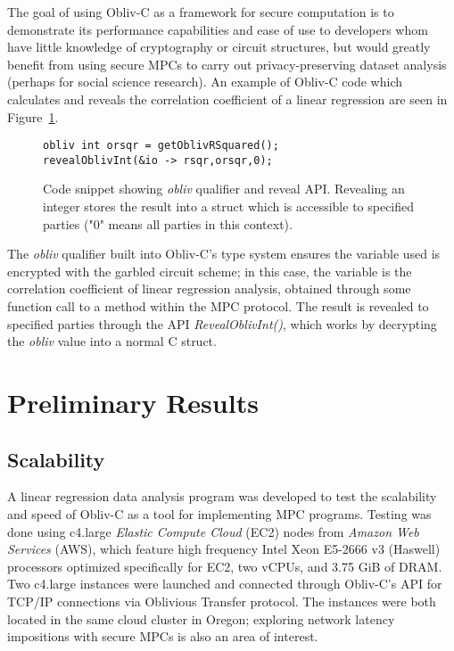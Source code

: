 \documentclass[conference]{IEEEtran}
\begin{document}
The goal of using Obliv-C as a framework for secure computation is to demonstrate 
its performance capabilities and ease of use to developers whom have little 
knowledge of cryptography or circuit structures, but would greatly benefit from 
using secure MPCs to carry out privacy-preserving dataset analysis (perhaps for
social science research). An example of Obliv-C code which calculates and 
reveals the correlation coefficient of a linear regression are seen in Figure~\ref{fig1}.
\begin{figure}[!b]
\centering
\begin{verbatim}
obliv int orsqr = getOblivRSquared();
revealOblivInt(&io -> rsqr,orsqr,0);
\end{verbatim}
\caption{Code snippet showing \emph{obliv} qualifier and reveal API. Revealing an integer
stores the result into a struct which is accessible to specified parties ("0" means
all parties in this context).}
\label{fig1}
\end{figure}
The \emph{obliv} qualifier built into Obliv-C's type system ensures the variable used
is encrypted with the garbled circuit scheme\cite{cryptoeprint:2015:1153}; in this
case, the variable is the correlation coefficient of linear regression analysis,
obtained through some function call to a method within the MPC protocol. The result
is revealed to specified parties through the API \emph{RevealOblivInt()}, which
works by decrypting the \emph{obliv} value into a normal C struct.

\section{Preliminary Results}
\subsection{Scalability}
A linear regression data analysis program was developed to test the scalability 
and speed of Obliv-C as a tool for implementing MPC programs. 
Testing was done using c4.large \emph{Elastic Compute Cloud} (EC2) nodes from \emph{Amazon Web Services} (AWS)\cite{aws:ec2}, which feature 
high frequency Intel Xeon E5-2666 v3 (Haswell) processors optimized specifically for EC2,
two vCPUs, and 3.75 GiB of DRAM.
Two c4.large instances were launched and connected through 
Obliv-C's API for TCP/IP connections via Oblivious Transfer protocol. The instances 
were both located in the same cloud cluster in Oregon; exploring network latency 
impositions with secure MPCs is also an area of interest.
\end{document}
